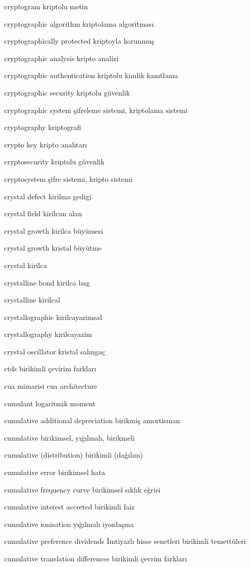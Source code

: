 \documentclass[12pt,fleqn]{article}\usepackage{../../common}
\begin{document}
cryptogram kriptolu metin

cryptographic algorithm kriptolama algoritması

cryptographically protected kriptoyla korunmuş

cryptographic analysis kripto analizi

cryptographic authentication kriptolu kimlik kanıtlama

cryptographic security kriptolu güvenlik

cryptographic system şifreleme sistemi, kriptolama sistemi

cryptography kriptografi

crypto key kripto anahtarı

cryptosecurity kriptolu güvenlik

cryptosystem şifre sistemi, kripto sistemi

crystal defect kirilma gedigi

crystal field kirilcan alan

crystal growth kirilca büyümesi

crystal growth kristal büyütme

crystal kirilca

crystalline bond kirilca bag

crystalline kirilcal

crystallographic kirilcayazimsal

crystallography kirilcayazim

crystal oscillator kristal salıngaç

ctds birikimli çevirim farkları

cua mimarisi cua architecture

cumulant logaritmik moment

cumulative additional depreciation birikmiş amortisman

cumulative birikimsel, yığılmalı, birikmeli

cumulative (distribution) birikimli (dağılım)

cumulative error birikimsel hata

cumulative frequency curve birikimsel sıklık eğrisi

cumulative interest accreted birikimli faiz

cumulative ionisation yığılmalı iyonlaşma

cumulative preference dividends İmtiyazlı hisse senetleri birikimli temettüleri

cumulative translation differences birikimli çevrim farkları
\end{document}
